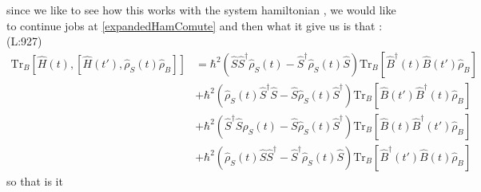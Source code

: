  since we like to see how this works with the system 
 hamiltonian , we would like to continue
 jobs at \eqref{expandedHamComute}
 and then what it give us is that : 
(L:927)
\begin{equation}
\begin{split}
\text{Tr}_{B }\left[\hat{H }(t ),\left[\hat{H }(t '),\hat{\rho }_{S }(t )\hat{\rho }_{B }\right]\right]&=\hbar ^{2}\left(\hat{S }\hat{S }^\dagger \hat{\rho }_{S }(t )-\hat{S }^\dagger \hat{\rho }_{S }(t )\hat{S }\right)\text{Tr}_{B }\left[\hat{B }^\dagger (t )\hat{B }(t ')\hat{\rho }_{B }\right]\\
&+\hbar ^{2}\left(\hat{\rho }_{S }(t )\hat{S }^\dagger \hat{S }-\hat{S }\hat{\rho }_{S }(t )\hat{S }^\dagger \right)\text{Tr}_{B }\left[\hat{B }(t ')\hat{B }^\dagger (t )\hat{\rho }_{B }\right]\\
&+\hbar ^{2}\left(\hat{S }^\dagger \hat{S }\hat{\rho }_{S }(t )-\hat{S }\hat{\rho }_{S }(t )\hat{S }^\dagger \right)\text{Tr}_{B }\left[\hat{B }(t )\hat{B }^\dagger (t ')\hat{\rho }_{B }\right]\\
&+\hbar ^{2}\left(\hat{\rho }_{S }(t )\hat{S }\hat{S }^\dagger -\hat{S }^\dagger \hat{\rho }_{S }(t )\hat{S }\right)\text{Tr}_{B }\left[\hat{B }^\dagger (t ')\hat{B }(t )\hat{\rho }_{B }\right]\end{split}
\end{equation}
 so that is it 
